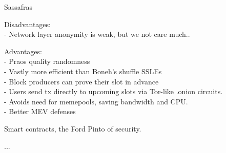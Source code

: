 \documentclass{beamer}
\begin{document}
\begin{frame}{Sassafras}

Disadvantages: \\
- Network layer anonymity is weak, but we not care much.. \\

\bigskip\bigskip

Advantages: \\ \smallskip
- Praos quality randomness \\ \smallskip
- Vastly more efficient than Boneh's shuffle SSLEs \\ \smallskip
- Block producers can prove their slot in advance \\ \smallskip
- Users send tx directly to upcoming slots via Tor-like {.onion} circuits. \\ \smallskip
- Avoids need for memepools, saving bandwidth and CPU. \\ \smallskip
- Better MEV defenses \\ \smallskip

\pause\bigskip\bigskip

\hspace{10pt} Smart contracts, the Ford Pinto of security.

\end{frame}



\begin{frame}
	
...	
	
\end{frame}
\end{document}
